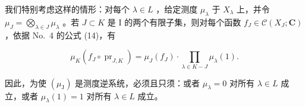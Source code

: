 我们特别考虑这样的情形：对每个 \(\lambda \in L\) ，给定测度 \(\mu_{\lambda}\) 于 \(X_{\lambda}\) 上，并令 \(\mu_{J} = \bigotimes_{\lambda \in J} \mu_{\lambda}\) 。若 \(J \subset K\) 是 I 的两个有限子集，则对每个函数 \(f_{J} \in \mathcal{C}(X_{J}; \mathbf{C})\) ，依据 No.~4 的公式 (14)，有

\[
\mu_ {K} \left(f _ {J} \circ \operatorname{pr} _ {J, K}\right) = \mu_ {J} \left(f _ {J}\right) \cdot \prod_ {\lambda \in K - J} \mu_ {\lambda} (1).\tag{17}
\]

因此，为使 \((\mu_{\mathrm{J}})\) 是测度逆系统，必须且只须：或者 \(\mu_{\lambda}=0\) 对所有 \(\lambda\in L\) 成立，或者 \(\mu_{\lambda}(1)=1\) 对所有 \(\lambda\in L\) 成立。

